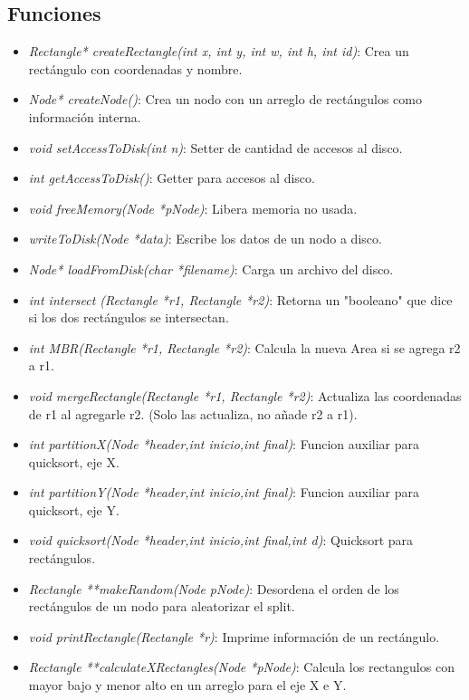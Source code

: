 \documentclass[letterpaper,10pt]{article}
\begin{document}
	\subsection{Funciones}

	\begin{itemize}
		\item \textit{Rectangle* createRectangle(int x, int y, int w, int h, int id)}: Crea un rectángulo con coordenadas y nombre.
		\item \textit{Node* createNode()}: Crea un nodo con un arreglo de rectángulos como información interna.
		\item \textit{void setAccessToDisk(int n)}: Setter de cantidad de accesos al disco.
		\item \textit{int getAccessToDisk()}: Getter para accesos al disco.
		\item \textit{void freeMemory(Node *pNode)}: Libera memoria no usada.
		\item \textit{writeToDisk(Node *data)}: Escribe los datos de un nodo a disco.
		\item \textit{Node* loadFromDisk(char *filename)}: Carga un archivo del disco.
		\item \textit{int intersect (Rectangle *r1, Rectangle *r2)}: Retorna un "booleano" que dice si los dos rectángulos se intersectan.
		\item \textit{int MBR(Rectangle *r1, Rectangle *r2)}: Calcula la nueva Area si se agrega r2 a r1.
		\item \textit{void mergeRectangle(Rectangle *r1, Rectangle *r2)}: Actualiza las coordenadas de r1 al agregarle r2. (Solo las actualiza, no añade r2 a r1).
		\item \textit{int partitionX(Node *header,int inicio,int final)}: Funcion auxiliar para quicksort, eje X.
		\item \textit{int partitionY(Node *header,int inicio,int final)}: Funcion auxiliar para quicksort, eje Y.
		\item \textit{void quicksort(Node *header,int inicio,int final,int d)}: Quicksort para rectángulos.
		\item \textit{Rectangle **makeRandom(Node pNode)}: Desordena el orden de los rectángulos de un nodo para aleatorizar el split.
		\item \textit{void printRectangle(Rectangle *r)}: Imprime información de un rectángulo.
		\item \textit{Rectangle **calculateXRectangles(Node *pNode)}: Calcula los rectangulos con mayor bajo y menor alto en un arreglo para el eje X e Y.

\end{itemize}
\end{document}
